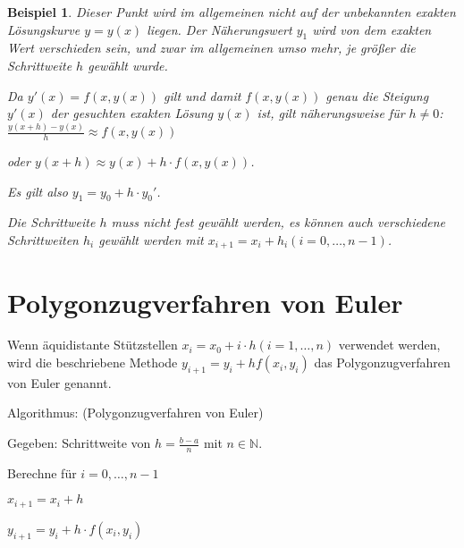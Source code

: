 \documentclass[fontset=ubuntu,12pt,a4paper]{scrreprt}
\newtheorem{beispiel}[defi]{Beispiel}
\begin{document}
\begin{beispiel}
        Dieser Punkt wird im allgemeinen nicht auf der unbekannten exakten Lösungskurve \(y=y(x)\) liegen. Der Näherungswert \(y_1\) wird von dem exakten Wert verschieden sein, und zwar im allgemeinen umso mehr, je größer die Schrittweite \(h\) gewählt wurde.

        Da \(y'(x)=f(x,y(x))\) gilt und damit \(f(x,y(x))\) genau die Steigung \(y'(x)\) der gesuchten exakten Lösung \(y(x)\) ist, gilt näherungsweise für \(h\neq0\): \(\frac{y(x+h)-y(x)}{h}\approx f(x,y(x))\)
        
        oder \(y(x+h)\approx y(x)+h\cdot f(x,y(x))\).
        
        Es gilt also \(y_1=y_0+h\cdot y_0'\).
        
        Die Schrittweite \(h\) muss nicht fest gewählt werden, es können auch verschiedene Schrittweiten \(h_i\) gewählt werden mit \(x_{i+1}=x_i+h_i (i=0,\dots,n-1)\).
    \end{beispiel}

\section{Polygonzugverfahren von Euler}

Wenn äquidistante Stützstellen \(x_i=x_0+i\cdot h (i=1,\dots,n)\) verwendet werden, wird die beschriebene Methode \(y_{i+1}=y_i+hf(x_i,y_i)\) das Polygonzugverfahren von Euler genannt.

Algorithmus: (Polygonzugverfahren von Euler)

Gegeben: Schrittweite von \(h=\frac{b-a}{n}\) mit \(n\in\mathbb{N}\).

Berechne für \(i=0,\dots,n-1\)

\(x_{i+1}=x_i+h\)

\(y_{i+1}=y_i+h\cdot f(x_i,y_i)\)
\end{document}
